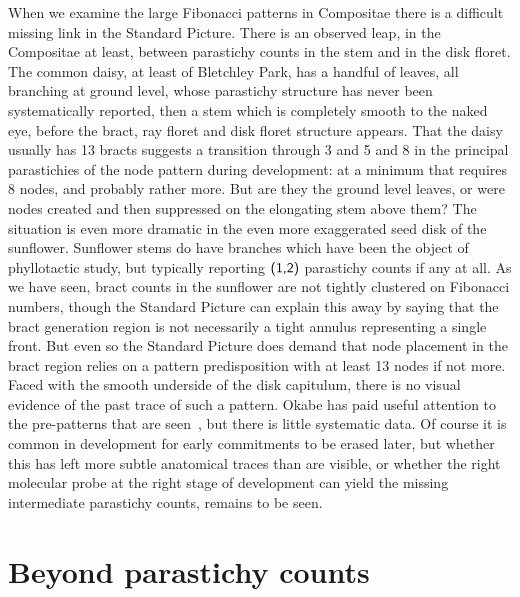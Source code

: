 When we examine the large Fibonacci patterns in {Compositae}  there is a difficult missing link in the Standard Picture. There is an observed leap, in the {Compositae} at least, between parastichy counts in the stem and in the disk floret. The common daisy, at least of Bletchley Park, has a handful of leaves, all branching at ground level, whose parastichy structure has never been systematically reported, then a stem which is completely smooth to the naked eye, before the bract, ray floret and disk floret structure appears. That the daisy usually has 13 bracts suggests a transition through 3 and 5 and 8 in the principal parastichies of the node pattern during development: at a minimum that requires 8 nodes, and probably rather more. But are they the ground level leaves, or were nodes created and then suppressed on the elongating stem above them? The situation is even more dramatic in the even more exaggerated seed disk of the sunflower. Sunflower stems do have branches which have been the object of phyllotactic study, but typically reporting $\textsf{(1,2)}$ parastichy counts if any at all. As we have seen, bract counts in the sunflower are not tightly clustered on Fibonacci numbers, though the Standard Picture can explain this away by saying that the bract generation region is not necessarily a tight annulus representing a single front. But even so the Standard Picture does demand that node placement in the bract region relies on a pattern predisposition with at least 13 nodes if not more. Faced with the smooth underside of the disk capitulum, there is no visual evidence of the past trace of such a pattern. Okabe has paid useful  attention to the pre-patterns that are seen~\autocite{okabeBiophysicalOptimalityGolden2015}, but there is little systematic data. Of course it is common in development for early commitments to be erased later, but whether this has left more subtle anatomical traces than are visible, or whether the right molecular probe at the right stage of development can yield the missing intermediate parastichy counts, remains to be seen. 

 \section{Beyond parastichy counts}
 

